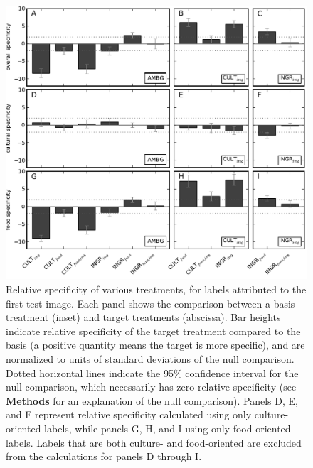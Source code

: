 \documentclass[a4paper]{report}
\begin{document}
\begin{figure}
	\includegraphics{figs/specificity-test0.pdf}
	\caption{Relative specificity of various treatments, for labels attributed
		to the first test image.
		Each panel shows the comparison between a basis treatment (inset) and 
		target treatments (abscissa).
		Bar heights indicate relative specificity of the target 
		treatment compared to the basis (a positive quantity means the target 
		is more specific), and are normalized to units of standard 
		deviations of the null comparison.  Dotted horizontal lines indicate
		the 95\% confidence interval for the null comparison, which necessarily
		has zero relative specificity (see \textbf{Methods} 
		for an explanation of the null comparison).  Panels D, E, and F 
		represent relative specificity calculated using only culture-oriented
		labels, while panels G, H, and I using only food-oriented labels.
		Labels that are both culture- and food-oriented are excluded from the
		calculations for panels D through I.
		}
	\end{figure}
\end{document}
